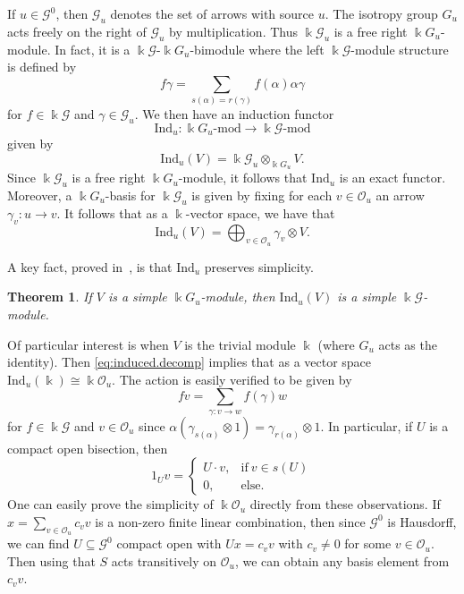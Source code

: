 \documentclass[11pt,reqno]{amsart}
\newtheorem{thm}{Theorem}[section]
\theoremstyle{plain}
\numberwithin{equation}{section}
\newcommand{\orb}[0]{\mathcal{O}}
\begin{document}
If $u\in \mathscr G^0$, then $\mathscr G_u$ denotes the set of arrows with source $u$.  The isotropy group $G_u$ acts freely on the right of $\mathscr G_u$ by multiplication.  Thus $\Bbbk \mathscr G_u$ is  a free right $\Bbbk G_u$-module.  In fact, it is a $\Bbbk \mathscr G$-$\Bbbk G_u$-bimodule where the left $\Bbbk \mathscr G$-module structure is defined by
\[f\gamma = \sum_{s(\alpha)=r(\gamma)} f(\alpha)\alpha\gamma\] for $f\in \Bbbk\mathscr G$ and $\gamma\in \mathscr G_u$.  We then have an induction functor
\[\mathrm{Ind}_u\colon \Bbbk G_u\text{-}\mathrm{mod}\to \Bbbk \mathscr G\text{-}\mathrm{mod}\] given by
\[\mathrm{Ind}_u(V) = \Bbbk \mathscr G_u\otimes_{\Bbbk G_u} V.\]  Since $\Bbbk \mathscr G_u$ is a free right $\Bbbk G_u$-module, it follows that $\mathrm{Ind}_u$ is an exact functor.  Moreover, a $\Bbbk G_u$-basis for $\Bbbk\mathscr G_u$ is given by fixing for each $v\in \orb_u$ an arrow $\gamma_v\colon u\to v$.  It follows that as a $\Bbbk$-vector space, we have that
\begin{equation}\label{eq:induced.decomp}
\mathrm{Ind}_u(V) = \bigoplus_{v\in \orb_u} \gamma_v\otimes V.
\end{equation}

A key fact, proved in~\cite{St10}, is that $\mathrm{Ind}_u$ preserves simplicity.

\begin{thm}
If $V$ is a simple $\Bbbk G_u$-module, then $\mathrm{Ind}_u(V)$ is a simple $\Bbbk\mathscr G$-module.
\end{thm}

Of particular interest is when $V$ is the trivial module $\Bbbk$ (where $G_u$ acts as the identity).  Then \eqref{eq:induced.decomp} implies that as a vector space $\mathrm{Ind}_u(\Bbbk)\cong \Bbbk \orb_u$.  The action is easily verified to be given by
\[fv = \sum_{\gamma\colon v\to w}f(\gamma)w\] for $f\in \Bbbk \mathscr G$ and $v\in \orb_u$ since $\alpha(\gamma_{s(\alpha)}\otimes 1) = \gamma_{r(\alpha)}\otimes 1$.  In particular, if $U$ is a compact open bisection, then
\[1_Uv = \begin{cases} U\cdot v, & \text{if}\ v\in s(U)\\ 0, & \text{else.} \end{cases}\]
One can easily prove the simplicity of $\Bbbk \orb_u$ directly from these observations.  If $x=\sum_{v\in \orb_u}c_vv$ is a non-zero finite linear combination, then since $\mathscr G^0$ is Hausdorff, we can find $U\subseteq \mathscr G^0$ compact open with $Ux=c_vv$ with $c_v\neq 0$ for some $v\in \orb_u$.  Then using that $S$ acts transitively on $\orb_u$, we can obtain any basis element from $c_vv$.
\end{document}
